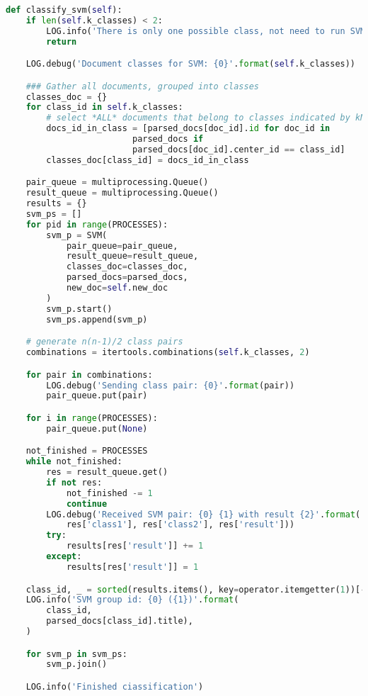 \begin{lstlisting}[language=Python, caption={Main.classify\_svm() - Main process method for conducting SVM classification}, label={lst:main:svm}]
def classify_svm(self):
    if len(self.k_classes) < 2:
        LOG.info('There is only one possible class, not need to run SVM')
        return

    LOG.debug('Document classes for SVM: {0}'.format(self.k_classes))

    ### Gather all documents, grouped into classes
    classes_doc = {}
    for class_id in self.k_classes:
        # select *ALL* documents that belong to classes indicated by kNN
        docs_id_in_class = [parsed_docs[doc_id].id for doc_id in
                         parsed_docs if
                         parsed_docs[doc_id].center_id == class_id]
        classes_doc[class_id] = docs_id_in_class

    pair_queue = multiprocessing.Queue()
    result_queue = multiprocessing.Queue()
    results = {}
    svm_ps = []
    for pid in range(PROCESSES):
        svm_p = SVM(
            pair_queue=pair_queue,
            result_queue=result_queue,
            classes_doc=classes_doc,
            parsed_docs=parsed_docs,
            new_doc=self.new_doc
        )
        svm_p.start()
        svm_ps.append(svm_p)

    # generate n(n-1)/2 class pairs
    combinations = itertools.combinations(self.k_classes, 2)

    for pair in combinations:
        LOG.debug('Sending class pair: {0}'.format(pair))
        pair_queue.put(pair)

    for i in range(PROCESSES):
        pair_queue.put(None)

    not_finished = PROCESSES
    while not_finished:
        res = result_queue.get()
        if not res:
            not_finished -= 1
            continue
        LOG.debug('Received SVM pair: {0} {1} with result {2}'.format(
            res['class1'], res['class2'], res['result']))
        try:
            results[res['result']] += 1
        except:
            results[res['result']] = 1

    class_id, _ = sorted(results.items(), key=operator.itemgetter(1))[-1]
    LOG.info('SVM group id: {0} ({1})'.format(
        class_id,
        parsed_docs[class_id].title),
    )

    for svm_p in svm_ps:
        svm_p.join()

    LOG.info('Finished ciassification')
\end{lstlisting}

